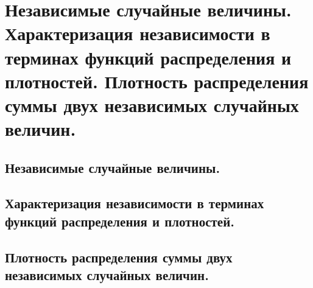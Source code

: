 \section{Независимые случайные величины. Характеризация независимости в терминах функций распределения и плотностей. Плотность распределения суммы двух независимых случайных величин.}

\subsection{Независимые случайные величины.}

\subsection{Характеризация независимости в терминах функций распределения и плотностей.}

\subsection{Плотность распределения суммы двух независимых случайных величин.}
